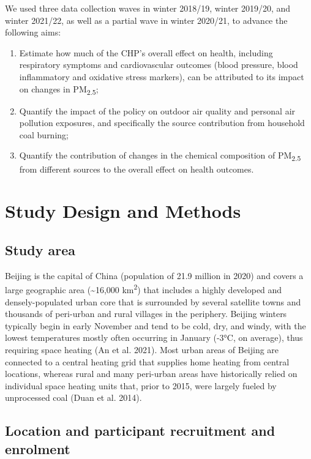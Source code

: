 \documentclass[
  letterpaper,
  DIV=11,
  numbers=noendperiod]{scrartcl}
\begin{document}
We used three data collection waves in winter 2018/19, winter 2019/20,
and winter 2021/22, as well as a partial wave in winter 2020/21, to
advance the following aims:

\begin{enumerate}
\def\labelenumi{\arabic{enumi}.}
\item
  Estimate how much of the CHP's overall effect on health, including
  respiratory symptoms and cardiovascular outcomes (blood pressure,
  blood inflammatory and oxidative stress markers), can be attributed to
  its impact on changes in PM\textsubscript{2.5};
\item
  Quantify the impact of the policy on outdoor air quality and personal
  air pollution exposures, and specifically the source contribution from
  household coal burning;
\item
  Quantify the contribution of changes in the chemical composition of
  PM\textsubscript{2.5} from different sources to the overall effect on
  health outcomes.
\end{enumerate}

\section{Study Design and Methods}\label{study-design-and-methods}

\subsection{Study area}\label{study-area}

Beijing is the capital of China (population of 21.9 million in 2020) and
covers a large geographic area (\textasciitilde16,000
km\textsuperscript{2}) that includes a highly developed and
densely-populated urban core that is surrounded by several satellite
towns and thousands of peri-urban and rural villages in the periphery.
Beijing winters typically begin in early November and tend to be cold,
dry, and windy, with the lowest temperatures mostly often occurring in
January (-3°C, on average), thus requiring space heating (An et al.
2021). Most urban areas of Beijing are connected to a central heating
grid that supplies home heating from central locations, whereas rural
and many peri-urban areas have historically relied on individual space
heating units that, prior to 2015, were largely fueled by unprocessed
coal (Duan et al. 2014).

\subsection{Location and participant recruitment and
enrolment}\label{location-and-participant-recruitment-and-enrolment}
\end{document}
